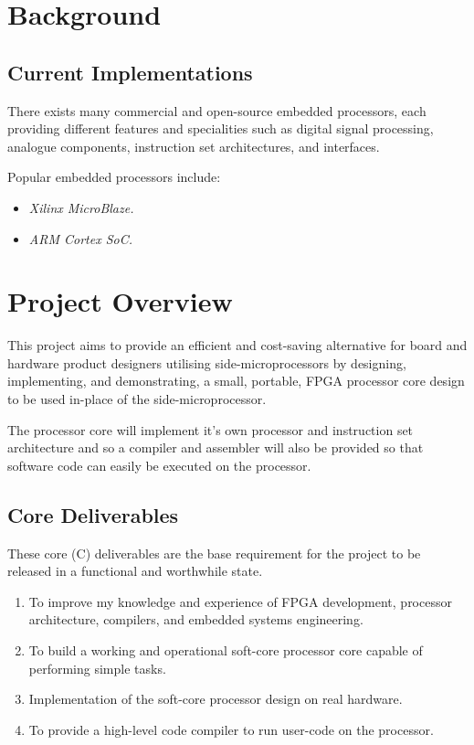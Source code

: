\documentclass[11pt,a4paper]{report}
\begin{document}

\section{Background}
\subsection{Current Implementations}
There exists many commercial and open-source embedded processors, each providing different features and specialities such as digital signal processing, analogue components, instruction set architectures, and interfaces.

Popular embedded processors include:
\begin{itemize}
\item{\textit{Xilinx MicroBlaze.}}
\item{\textit{ARM Cortex SoC.}}
\end{itemize}

\newpage
\section{Project Overview}
This project aims to provide an efficient and cost-saving alternative for board and hardware product designers utilising side-microprocessors by designing, implementing, and demonstrating, a small, portable, FPGA processor core design to be used in-place of the side-microprocessor. 

The processor core will implement it's own processor and instruction set architecture and so a compiler and assembler will also be provided so that software code can easily be executed on the processor.

\subsection{Core Deliverables}
These core (C) deliverables are the base requirement for the project to be released in a functional and worthwhile state.
\begin{enumerate}[label=\bfseries C\arabic*.]
\item{To improve my knowledge and experience of FPGA development, processor architecture, compilers, and embedded systems engineering.}
\item{To build a working and operational soft-core processor core capable of performing simple tasks.}
\item{Implementation of the soft-core processor design on real hardware.}
\item{To provide a high-level code compiler to run user-code on the processor.}
\end{enumerate}
\end{document}
